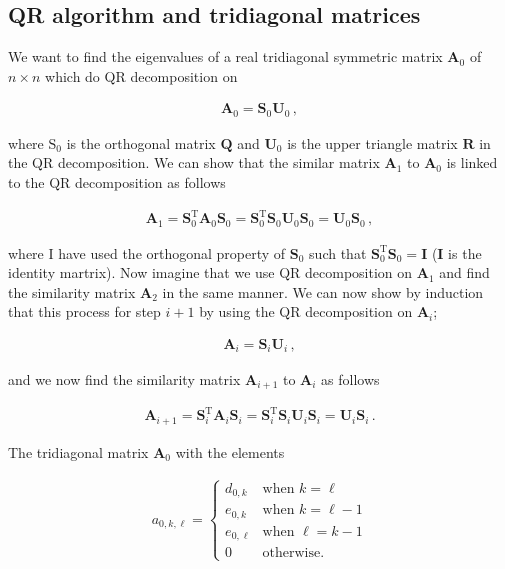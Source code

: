 \documentclass[11pt,english,a4paper]{article}
\begin{document}
\begin{flushleft}
\subsection{QR algorithm and tridiagonal matrices}

We want to find the eigenvalues of a real tridiagonal symmetric matrix $\textbf{A}_0$ of $n\times n$ which do QR decomposition on

\begin{align*}
\textbf{A}_0 = \textbf{S}_0\textbf{U}_0 \,,
\end{align*}

where $\text{S}_0$ is the orthogonal matrix $\textbf{Q}$ and $\textbf{U}_0$ is the upper triangle matrix $\textbf{R}$ in the QR decomposition. We can show that the similar matrix $\textbf{A}_1$ to $\textbf{A}_0$ is linked to the QR decomposition as follows

\begin{align*}
\textbf{A}_1 = \textbf{S}_0^{\text{T}} \textbf{A}_0 \textbf{S}_0 
=\textbf{S}_0^{\text{T}} \textbf{S}_0\textbf{U}_0 \textbf{S}_0 = \textbf{U}_0 \textbf{S}_0 \,,
\end{align*}

where I have used the orthogonal property of $\textbf{S}_0$ such that $\textbf{S}_0^{\text{T}} \textbf{S}_0 = \textbf{I}$ ($\textbf{I}$ is the identity martrix). Now imagine that we use QR decomposition on $\textbf{A}_1$ and find the similarity matrix $\textbf{A}_2$ in the same manner. We can now show by induction that this process for step $i+1$ by using the QR decomposition on $\textbf{A}_i$;

\begin{align*}
\textbf{A}_i = \textbf{S}_i \textbf{U}_i \,,
\end{align*}

and we now find the similarity matrix $\textbf{A}_{i+1}$ to $\textbf{A}_i$ as follows

\begin{align*}
\textbf{A}_{i+1} = \textbf{S}_i^{\text{T}} \textbf{A}_i \textbf{S}_i 
=\textbf{S}_i^{\text{T}} \textbf{S}_i\textbf{U}_i \textbf{S}_i = \textbf{U}_i \textbf{S}_i \,.
\end{align*}

The tridiagonal matrix $\textbf{A}_0$ with the elements 

\begin{align*}
a_{0,k,\ell} = \begin{cases} d_{0,k} & \text{when }k=\ell \\ e_{0,k} & \text{when }k=\ell-1\\ e_{0,\ell} & \text{when }\ell=k-1 \\ 0 & \text{otherwise.}\end{cases}
\end{align*}


\end{flushleft}
\end{document}
